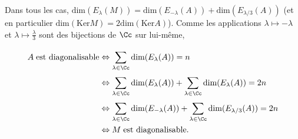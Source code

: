 {{Dans tous les cas, $\text{dim}(E_\lambda(M))=\text{dim}(E_{-\lambda}(A))+\text{dim}(E_{\lambda/3}(A))$ (et en particulier $\text{dim}(\text{Ker}M)=2\text{dim}(\text{Ker}A)$).
Comme les applications $\lambda\mapsto -\lambda$ et $\lambda\mapsto\frac{\lambda}{3}$ sont des bijections de $\Cc$ sur lui-même,

\begin{align*}\ensuremath
A\;\text{est diagonalisable}&\Leftrightarrow\sum_{\lambda\in\Cc}^{}\text{dim}(E_{\lambda}(A)) = n\\
 &\Leftrightarrow\sum_{\lambda\in\Cc}^{}\text{dim}(E_{\lambda}(A))+\sum_{\lambda\in\Cc}^{}\text{dim}(E_{\lambda}(A))= 2n\\
 &\Leftrightarrow\sum_{\lambda\in\Cc}^{}\text{dim}(E_{-\lambda}(A))+\sum_{\lambda\in\Cc}^{}\text{dim}(E_{\lambda/3}(A))= 2n\\
 &\Leftrightarrow M\;\text{est diagonalisable}.
\end{align*}
}
}
